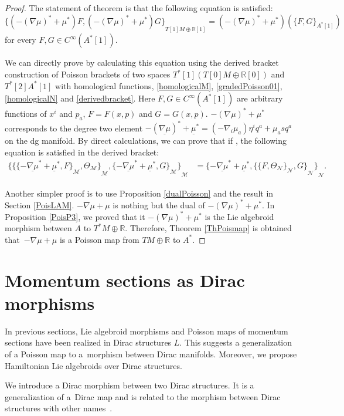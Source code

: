 \documentclass[pdftex]{sigma}
\numberwithin{equation}{section}
\def\bR{{\mathbb{R}}}
\newcommand{\calM}{{\mathcal M}}
\newcommand{\calN}{{\mathcal N}}
\newcommand{\sbv}[2]{{\{{{#1},{#2}}\}}}
\newcommand{\bracket}[2]{\langle #1,\,#2\rangle}
\newcommand{\Thetam}{{\Theta_{\calM}}}
\newcommand{\Thetan}{{\Theta_{\calN}}}
\newcommand{\umu}{\underline{\mu}}
\newcommand{\unablamu}{\underline{\nabla \mu}}
\newcommand{\baS}{{{}^A S}}
\begin{document}
\begin{proof}
The statement of theorem is that the following equation is satisfied:
\[
\sbv{(-(\nabla \mu)^* + \mu^*) F}{(-(\nabla \mu)^* + \mu^*)G}_{T[1]M \oplus \bR[1]} = (-(\nabla \mu)^* + \mu^*)(\sbv{F}{G}_{A^*[1]})
\]
for every $F, G \in C^{\infty}(A^*[1])$.


We can directly prove by calculating this equation
using the derived bracket construction of
Poisson brackets of two spaces $T^*[1](T[0]M \oplus \bR[0])$ and $T^*[2]A^*[1]$
with homological functions, \eqref{homologicalM}, \eqref{gradedPoisson01}, \eqref{homologicalN} and \eqref{derivedbracket}.
Here $F, G \in C^{\infty}(A^*[1])$ are arbitrary functions of $x^i$ and $p_a$,
$F= F(x, p)$ and $G= G(x, p)$.
$-(\nabla \mu)^* + \mu^*$ corresponds to the degree two element $-(\unablamu)^* + \umu^* =
(-\nabla_i \mu_a) \eta^i q^a + \mu_a s q^a$ on the dg manifold.
By direct calculations,
we can prove that if \smash{$\bracket{\baS}{\mu} =0$},
the following equation is satisfied
in the derived bracket:
\begin{align*}
\sbv{\sbv{\sbv{-\unablamu^* + \umu^*}{F}_{\calM}}{\Thetam}_{\calM}}
{\sbv{-\unablamu^* + \umu^*}{G}_{\calM}}_{\calM} &=
\sbv{-\unablamu^* + \umu^*}{\sbv{\sbv{F}{\Thetan}_{\calN}}{G}_{\calN}}_{\calN}.
\end{align*}

Another simpler proof is to use Proposition \ref{dualPoisson}
and the result in Section \ref{PoisLAM}.
$-\nabla \mu + \mu$ is nothing but the dual of
$-(\nabla \mu)^* + \mu^*$.
In Proposition \ref{PoisP3}, we proved that it
$-(\nabla \mu)^* + \mu^*$ is the Lie algebroid morphism
between $A$ to $T^*M \oplus \bR$.
Therefore, Theorem \ref{ThPoismap} is obtained that~${-\nabla \mu + \mu}$ is a Poisson map from
$TM \oplus \bR$ to $A^*$.
\end{proof}

\section{Momentum sections as Dirac morphisms}\label{sec:Dirac}
In previous sections, Lie algebroid morphisms and Poisson maps
of momentum sections have been realized in Dirac structures $L$.
This suggests a generalization of a Poisson map to a~morphism between
Dirac manifolds.
Moreover, we propose Hamiltonian Lie algebroids over Dirac structures.


We introduce a Dirac morphism \cite{AlekseevBursztynMeinrenken} between two Dirac structures. It is a generalization of a~Dirac map \cite{BursztynCrainic1, BursztynCrainic2} and is related to the morphism between Dirac structures with other names~\cite{BursztynIglesiasPonteSevera}.
\end{document}
